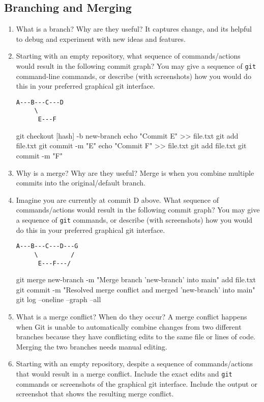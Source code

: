 \documentclass[10pt,twocolumn]{article}
\begin{document}
\subsection{Branching and Merging}

\begin{enumerate}
\item What is a branch? Why are they useful?
It captures change, and its helpful to debug and experiment with new ideas and features. 
\item Starting with an empty repository, what sequence of commands/actions would result in the following commit graph? You may give a sequence of \texttt{git} command-line commands, or describe (with screenshots) how you would do this in your preferred graphical git interface.
\begin{verbatim}
A---B---C---D
     \
      E---F
\end{verbatim}
git checkout [hash] -b new-branch
echo "Commit E" >> file.txt
git add file.txt
git commit -m "E"
echo "Commit F" >> file.txt
git add file.txt
git commit -m "F"

\item Why is a merge? Why are they useful?
Merge is when you combine multiple commits into the original/default branch. 
\item Imagine you are currently at commit D above. What sequence of commands/actions would result in the following commit graph? You may give a sequence of \texttt{git} commands, or describe (with screenshots) how you would do this in your preferred graphical git interface.
\begin{verbatim}
A---B---C---D---G
     \         /
      E---F---/
\end{verbatim}
git merge new-branch -m "Merge branch 'new-branch' into main"
add file.txt
git commit -m "Resolved merge conflict and merged 'new-branch' into main"
git log --oneline --graph --all


\item What is a merge conflict? When do they occur?
\newline
A merge conflict happens when Git is unable to automatically combine changes from two different branches because they have conflicting edits to the same file or lines of code. Merging the two branches needs manual editing.
\item Starting with an empty repository, despite a sequence of commands/actions that would result in a merge conflict. Include the exact edits and \texttt{git} commands or screenshots of the graphical git interface. Include the output or screenshot that shows the resulting merge conflict.
\end{enumerate}
\end{document}
